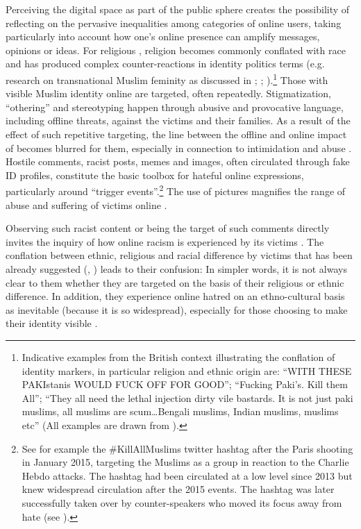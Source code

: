\documentclass[output=paper,colorlinks,citecolor=brown]{langscibook}
\begin{document}
Perceiving the digital space as part of the public sphere creates the possibility of reflecting on the pervasive inequalities among categories of online users, taking particularly into account how one's online presence can amplify messages, opinions or ideas. For religious , religion becomes commonly conflated with race and has produced complex counter-reactions in identity politics terms (e.g. research on transnational Muslim feminity as discussed in \citealt{falah_nagel2005}; \citealt{dwyer_shah2009}; \citealt{warren2018}).\footnote{%
Indicative examples from the British context illustrating the conflation of identity markers, in particular religion and ethnic origin are: ``WITH THESE PAKIstanis WOULD FUCK OFF FOR GOOD''; ``Fucking Paki's. Kill them All''; ``They all need the lethal injection dirty vile bastards. It is not just paki muslims, all muslims are scum…Bengali muslims, Indian muslims,  muslims etc'' (All examples are drawn from \citealt{awan2016}).} 
Those with visible Muslim identity online are targeted, often repeatedly.  Stigmatization, ``othering'' and stereotyping happen through abusive and provocative language, including offline threats, against the victims and their families. As a result of the effect of such repetitive targeting, the line between the offline and online impact of  becomes blurred for them, especially in connection to intimidation and abuse \citep[6]{awan_zempi2015_we_fear}. Hostile comments, racist posts, memes and images, often circulated through fake ID profiles, constitute the basic toolbox for hateful online expressions, particularly around ``trigger events''.\footnote{%
See for example the \#KillAllMuslims twitter hashtag after the Paris shooting in January 2015, targeting the Muslims as a group in reaction to the Charlie Hebdo attacks. The hashtag had been circulated at a low level since 2013 but knew widespread circulation after the 2015 events. The hashtag was later successfully taken over by counter-speakers who moved its focus away from hate (see \citealt{BBCTrending2015}).} 
The use of pictures magnifies the range of abuse and suffering of victims online \citep[20]{awan_zempi2015_virtual_physical}. 

Observing such racist content or being the target of such comments directly invites the inquiry of how online racism is experienced by its victims \citep{nadim2023}. The conflation between ethnic, religious and racial difference by victims that has been already suggested (\citealt[5]{nadim2023}, \citealt{garner_seod2014}) leads to their confusion: In simpler words, it is not always clear to them whether they are targeted on the basis of their religious or ethnic difference. In addition, they experience online hatred on an ethno-cultural basis as inevitable (because it is so widespread), especially for those choosing to make their  identity visible \citep[9]{nadim2023}.
\end{document}
